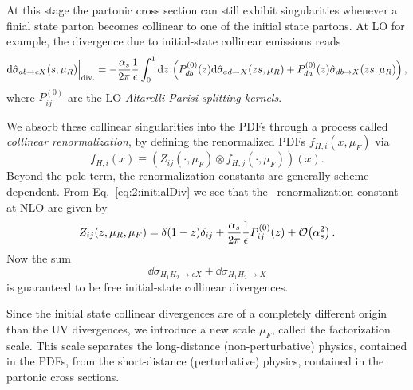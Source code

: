 At this stage the partonic cross section can still exhibit singularities whenever a finial state parton becomes collinear to one of the initial state partons. At \acs{LO} for example, the divergence due to initial-state collinear emissions reads
\begin{equation}
\mathrm{d} \hat{\sigma}_{a b \rightarrow c X}(s, \mu_R) \Big\vert_{\text{div.}} = - \frac{\alpha_s}{2 \pi} \frac{1}{\epsilon}  \int_0^1 \mathrm{d} z\, \left(P_{db}^{(0)}(z) \mathrm{d} \hat{\sigma}_{a d \rightarrow X}(z s, \mu_R) + P_{da}^{(0)}(z) \hat{\sigma}_{d b \rightarrow X}(zs, \mu_R) \right),
\label{eq:2:initialDiv}
\end{equation}
where $P_{ij}^{(0)}$ are the \acs{LO} \textit{Altarelli-Parisi splitting kernels}.

We absorb these collinear singularities into the PDFs through a process called \textit{collinear renormalization}, by defining the renormalized \acs{PDF}s $f_{H, i}(x, \mu_F)$ via
\begin{equation}
f_{H, i}(x) \equiv (Z_{ij}(\cdot, \mu_F) \otimes f_{H, j}(\cdot, \mu_F))(x).
\end{equation}
Beyond the pole term, the renormalization constants are generally scheme dependent. From Eq.~\eqref{eq:2:initialDiv} we see that the \MS\ renormalization constant at NLO are given by
\begin{equation}
Z_{ij}(z, \mu_R, \mu_F) = \delta(1 - z) \delta_{ij} + \frac{\alpha_s}{2 \pi} \frac{1}{\epsilon} P_{ij}^{(0)}(z) + \mathcal{O}\!\left(\alpha_s^2\right).
\end{equation}
Now the sum
\begin{equation}
\dd \sigma_{H_1 H_2 \rightarrow c X} + \dd \sigma_{H_1 H_2 \rightarrow X}
\end{equation}
is guaranteed to be free initial-state collinear divergences.

Since the initial state collinear divergences are of a completely different origin than the \acs{UV} divergences, we introduce a new scale $\mu_F$, called the factorization scale. This scale separates the long-distance (non-perturbative) physics, contained in the PDFs, from the short-distance (perturbative) physics, contained in the partonic cross sections.

